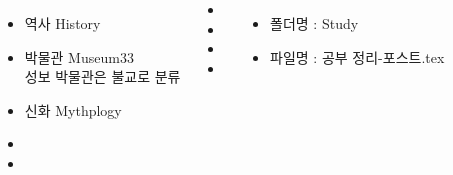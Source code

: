 \documentclass[	25pt, 
							a1paper, 
							landscape,
							margin=0mm, %
							innermargin=10mm,  		%
							blockverticalspace=4mm, %
							colspace=5mm, 
							subcolspace=0mm
							]{tikzposter}
\begin{document}
\begin{columns}

			{
					\begin{itemize}
					\item 	역사    History
					\item 	박물관 Museum33 \\
							성보 박물관은 불교로 분류
					\item 	신화    Mythplogy
					\item 
					\item 
					\end{itemize}
			} %







			{
				\begin{LARGE}
					\begin{itemize}
					\item 
					\item 
					\item 
					\item 
					\end{itemize}
				\end{LARGE}
			} %


			{
					\begin{itemize}
					\item 폴더명 : Study
					\item 파일명 : 공부 정리-포스트.tex
					\end{itemize}
			}






	\end{columns}
\end{document}
